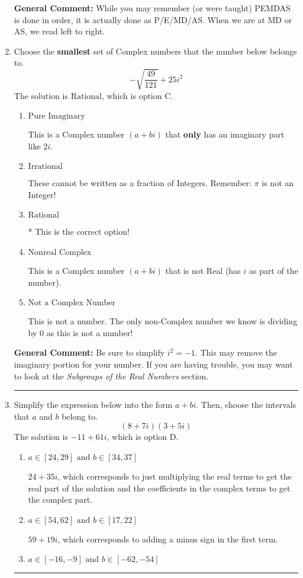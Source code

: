 \documentclass{extbook}[14pt]
\newcommand{\litem}[1]{\item #1

\rule{\textwidth}{0.4pt}}
\begin{document}
\begin{enumerate}
{\textbf{General Comment:} While you may remember (or were taught) PEMDAS is done in order, it is actually done as P/E/MD/AS. When we are at MD or AS, we read left to right.
}
\litem{
Choose the \textbf{smallest} set of Complex numbers that the number below belongs to.
\[ -\sqrt{\frac{49}{121}} + 25i^2 \]
The solution is \( \text{Rational} \), which is option C.\begin{enumerate}[label=\Alph*.]
\item \( \text{Pure Imaginary} \)

This is a Complex number $(a+bi)$ that \textbf{only} has an imaginary part like $2i$.
\item \( \text{Irrational} \)

These cannot be written as a fraction of Integers. Remember: $\pi$ is not an Integer!
\item \( \text{Rational} \)

* This is the correct option!
\item \( \text{Nonreal Complex} \)

This is a Complex number $(a+bi)$ that is not Real (has $i$ as part of the number).
\item \( \text{Not a Complex Number} \)

This is not a number. The only non-Complex number we know is dividing by 0 as this is not a number!
\end{enumerate}

\textbf{General Comment:} Be sure to simplify $i^2 = -1$. This may remove the imaginary portion for your number. If you are having trouble, you may want to look at the \textit{Subgroups of the Real Numbers} section.
}
\litem{
Simplify the expression below into the form $a+bi$. Then, choose the intervals that $a$ and $b$ belong to.
\[ (8 + 7 i)(3 + 5 i) \]
The solution is \( -11 + 61 i \), which is option D.\begin{enumerate}[label=\Alph*.]
\item \( a \in [24, 29] \text{ and } b \in [34, 37] \)

 $24 + 35 i$, which corresponds to just multiplying the real terms to get the real part of the solution and the coefficients in the complex terms to get the complex part.
\item \( a \in [54, 62] \text{ and } b \in [17, 22] \)

 $59 + 19 i$, which corresponds to adding a minus sign in the first term.
\item \( a \in [-16, -9] \text{ and } b \in [-62, -54] \)


\end{enumerate}}
\end{enumerate}
\end{document}
